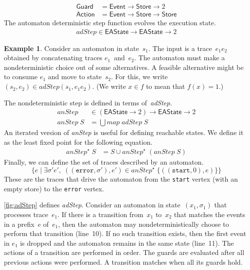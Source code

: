 \documentclass[preprint]{sigplanconf} %
\newcommand{\set}[1]{\ensuremath{\mathsf{#1}}}
\theoremstyle{definition}
\newtheorem{example}{Example}
\theoremstyle{remark}
\begin{document}
\begin{align}
\set{Guard}&=\set{Event}\to\set{Store}\to2 \\
\set{Action}&=\set{Event}\to\set{Store}\to\set{Store}
\end{align}
The automaton deterministic step function evolves the execution state.
\begin{align}
\mathit{adStep}\in\set{EAState}\to\set{EAState}\to2 \label{eq:adstep}
\end{align}
\begin{example}
Consider an automaton in state~$s_1$.
The input is a trace~$e_1e_2$ obtained by concatenating traces $e_1$~and~$e_2$.
The automaton must make a nondeterministic choice out of some alternatives.
A feasible alternative might be to consume $e_1$ and move to state~$s_2$.
For this, we write $(s_2,e_2)\in\mathit{adStep}(s_1,e_1e_2)$.
(We write $x\in f$ to mean that $f(x)=1$.)
\end{example}
The nondeterministic step is defined in terms of~\textit{adStep}.
\begin{align}
\mathit{anStep}&\in(\set{EAState}\to2)\to\set{EAState}\to2\\
\mathit{anStep}\;S&=\bigcup \mathit{map}\;\mathit{adStep}\;S \label{eq:anstep}
\end{align}
An iterated version of \textit{anStep} is useful for defining reachable states.
We define it as the least fixed point for the following equation.
\begin{align}
\mathit{anStep}^\star\;S &= S \cup \mathit{anStep}^\star\;(\mathit{anStep}\;S)
\end{align}
Finally, we can define the set of traces described by an automaton.
\[ \{ e \mid \exists\sigma'e',\;((\mathtt{error},\sigma'),e')\in\mathit{anStep}^\star\;\{((\mathtt{start},0),e)\}\} \]
These are the traces that drive the automaton from the \texttt{start} vertex (with an empty store) to the \texttt{error} vertex.

\autoref{fig:adStep} defines \textit{adStep}.
Consider an automaton in state~$(x_1,\sigma_1)$ that processes trace~$e_1$.
If there is a transition from~$x_1$ to~$x_2$ that matches the events in a prefix~$e$ of~$e_1$, then the automaton may nondeterministically choose to perform that transition (line~10).
If no such transition exists, then the first event in $e_1$ is dropped and the automaton remains in the same state (line~11).
The actions of a transition are performed in order.
The guards are evaluated after all previous actions were performed.
A transition matches when all its guards hold.
\end{document}
